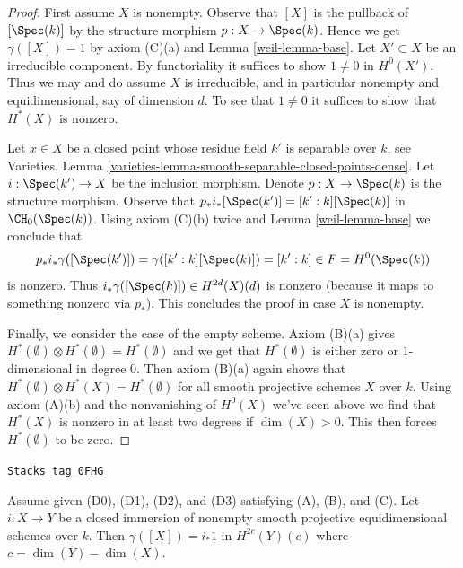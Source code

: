 \begin{proof}

First assume $X$ is nonempty.
Observe that $[X]$ is the pullback of $[\Spec(k)]$ by the structure morphism
$p : X \to \Spec(k)$. Hence we get $\gamma([X]) = 1$ by axiom (C)(a)
and Lemma \ref{weil-lemma-base}. Let $X' \subset X$ be an irreducible component.
By functoriality it suffices to show $1 \not = 0$ in $H^0(X')$.
Thus we may and do assume $X$ is irreducible, and in particular
nonempty and equidimensional, say of dimension $d$.
To see that $1 \not = 0$ it suffices to show that $H^*(X)$ is nonzero.

\medskip\noindent
Let $x \in X$ be a closed point whose residue field $k'$
is separable over $k$, see
Varieties, Lemma \ref{varieties-lemma-smooth-separable-closed-points-dense}.
Let $i : \Spec(k') \to X$ be the inclusion morphism.
Denote  $p : X \to \Spec(k)$ is the structure morphism.
Observe that
$p_*i_*[\Spec(k')] = [k' : k][\Spec(k)]$ in $\CH_0(\Spec(k))$.
Using axiom (C)(b) twice and Lemma \ref{weil-lemma-base}
we conclude that
$$
p_*i_*\gamma([\Spec(k')]) = \gamma([k' : k][\Spec(k)]) = [k' : k]
\in F = H^0(\Spec(k))
$$
is nonzero. Thus $i_*\gamma([\Spec(k)]) \in H^{2d}(X)(d)$ is nonzero
(because it maps to something nonzero via $p_*$). This concludes the proof
in case $X$ is nonempty.

\medskip\noindent
Finally, we consider the case of the empty scheme. Axiom (B)(a) gives
$H^*(\emptyset) \otimes H^*(\emptyset) = H^*(\emptyset)$ and
we get that $H^*(\emptyset)$ is either zero or $1$-dimensional
in degree $0$. Then axiom (B)(a) again shows that
$H^*(\emptyset) \otimes H^*(X) = H^*(\emptyset)$ for
all smooth projective schemes $X$ over $k$. Using axiom (A)(b)
and the nonvanishing of $H^0(X)$ we've seen above
we find that $H^*(X)$ is nonzero in at least two degrees
if $\dim(X) > 0$. This then forces $H^*(\emptyset)$ to be zero.
\end{proof}

\begin{lemma}
\label{weil-lemma-push-unit}
\href{https://stacks.math.columbia.edu/tag/0FHG}{\texttt{Stacks tag 0FHG}}

Assume given (D0), (D1), (D2), and (D3) satisfying (A), (B), and (C).
Let $i : X \to Y$ be a closed immersion of nonempty smooth projective
equidimensional schemes over $k$. Then
$\gamma([X]) = i_*1$ in $H^{2c}(Y)(c)$ where $c = \dim(Y) - \dim(X)$.
\end{lemma}

